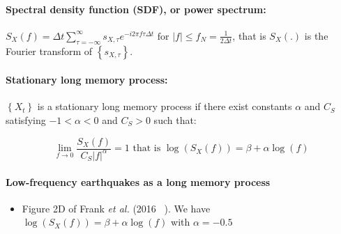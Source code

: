 \documentclass[methods.tex]{subfiles}
\begin{document}
\paragraph{Spectral density function (SDF), or power spectrum:} $S_X \left( f \right) = \Delta t \sum_{\tau = - \infty}^{\infty} s_{X , \tau} e^{- i 2 \pi f \tau \Delta t} \text{ for } \left| f \right| \leq f_N = \frac{1}{2 \Delta t}$, that is $S_X \left( . \right)$ is the Fourier transform of $\left\{ s_{X , \tau} \right\}$.

\paragraph{Stationary long memory process:} $\left\{ X_t \right\}$ is a stationary long memory process if there exist constants $\alpha$ and $C_S$ satisfying $ -1 < \alpha < 0$ and $C_S > 0$ such that:

\begin{equation}
\lim_{f \to 0} \frac{S_X \left( f \right)}{C_S \left| f \right| ^{\alpha}} = 1 \text{ that is } \log \left( S_X \left( f \right) \right) = \beta + \alpha \log \left( f \right)
\end{equation}

\paragraph{Low-frequency earthquakes as a long memory process}

\begin{itemize}
\item Figure 2D of Frank \textit{et al.} (2016 ~\cite{FRA_2016}). We have $\log \left( S_X \left( f \right) \right) = \beta + \alpha \log \left( f \right)$ with $\alpha = - 0.5$
\end{itemize}
\end{document}
